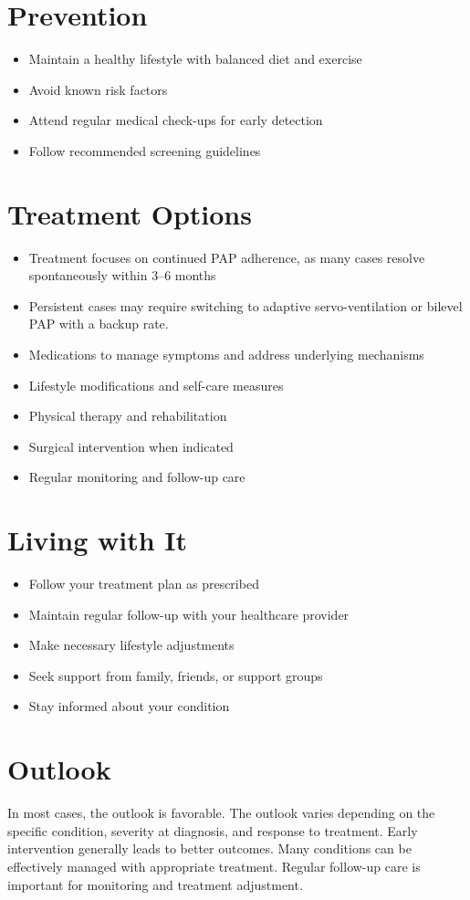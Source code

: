 \section{Prevention}
\begin{itemize}[noitemsep]
  \item Maintain a healthy lifestyle with balanced diet and exercise
  \item Avoid known risk factors
  \item Attend regular medical check-ups for early detection
  \item Follow recommended screening guidelines
\end{itemize}
\section{Treatment Options}
\begin{itemize}[noitemsep]
  \item Treatment focuses on continued PAP adherence, as many cases resolve spontaneously within 3--6 months
  \item Persistent cases may require switching to adaptive servo-ventilation or bilevel PAP with a backup rate.
  \item Medications to manage symptoms and address underlying mechanisms
  \item Lifestyle modifications and self-care measures
  \item Physical therapy and rehabilitation
  \item Surgical intervention when indicated
  \item Regular monitoring and follow-up care
\end{itemize}
\section{Living with It}
\begin{itemize}[noitemsep]
  \item Follow your treatment plan as prescribed
  \item Maintain regular follow-up with your healthcare provider
  \item Make necessary lifestyle adjustments
  \item Seek support from family, friends, or support groups
  \item Stay informed about your condition
\end{itemize}
\section{Outlook}
In most cases, the outlook is favorable. The outlook varies depending on the specific condition, severity at diagnosis, and response to treatment. Early intervention generally leads to better outcomes. Many conditions can be effectively managed with appropriate treatment. Regular follow-up care is important for monitoring and treatment adjustment.
